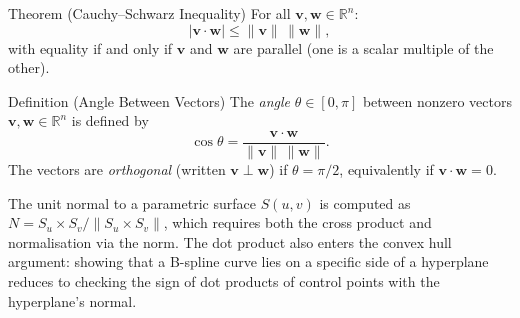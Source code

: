 \begin{theorembox}{Theorem (Cauchy--Schwarz Inequality)}
For all $\mathbf{v}, \mathbf{w} \in \mathbb{R}^n$:
\[
  |\mathbf{v} \cdot \mathbf{w}| \leq \|\mathbf{v}\|\,\|\mathbf{w}\|,
\]
with equality if and only if $\mathbf{v}$ and $\mathbf{w}$ are parallel
(one is a scalar multiple of the other).
\end{theorembox}

\begin{propositionbox}{Definition (Angle Between Vectors)}
The \emph{angle} $\theta \in [0, \pi]$ between nonzero vectors $\mathbf{v}, \mathbf{w} \in \mathbb{R}^n$
is defined by
\[
  \cos\theta = \frac{\mathbf{v} \cdot \mathbf{w}}{\|\mathbf{v}\|\,\|\mathbf{w}\|}.
\]
The vectors are \emph{orthogonal} (written $\mathbf{v} \perp \mathbf{w}$) if $\theta = \pi/2$,
equivalently if $\mathbf{v} \cdot \mathbf{w} = 0$.
\end{propositionbox}

\begin{remark*}
The unit normal to a parametric surface $S(u,v)$ is computed as
$N = S_u \times S_v / \|S_u \times S_v\|$, which requires both the
cross product and normalisation via the norm.
The dot product also enters the convex hull argument: showing that a
B-spline curve lies on a specific side of a hyperplane reduces to
checking the sign of dot products of control points with the hyperplane's normal.
\end{remark*}
